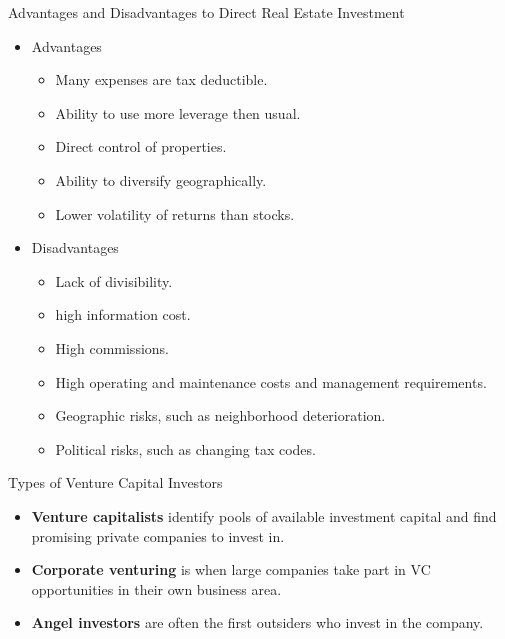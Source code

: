 \documentclass[../custom]{flashcards}
\begin{document}
\begin{flashcard}{Advantages and Disadvantages to Direct Real Estate Investment}
    \begin{itemize}
        \item Advantages
        \begin{itemize}
            \item Many expenses are tax deductible.
            \item Ability to use more leverage then usual.
            \item Direct control of properties.
            \item Ability to diversify geographically.
            \item Lower volatility of returns than stocks.
        \end{itemize}
        \item Disadvantages
        \begin{itemize}
            \item Lack of divisibility.
            \item high information cost.
            \item High commissions.
            \item High operating and maintenance costs and management requirements.
            \item Geographic risks, such as neighborhood deterioration.
            \item Political risks, such as changing tax codes.
        \end{itemize}
    \end{itemize}
\end{flashcard}

\begin{flashcard}{Types of Venture Capital Investors}
    \begin{itemize}
        \item \textbf{Venture capitalists} identify pools of available investment capital and find promising private companies to invest in.
        \item \textbf{Corporate venturing} is when large companies take part in VC opportunities in their own business area.
        \item \textbf{Angel investors} are often the first outsiders who invest in the company.
    \end{itemize}
\end{flashcard}
\end{document}
